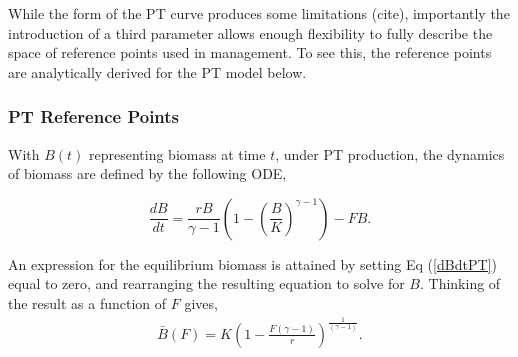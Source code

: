 \documentclass[12pt]{article}
\begin{document}



%
While the form of the PT curve produces some limitations {(\color{red}cite)}, 
importantly the %
introduction of a third parameter allows enough flexibility to fully describe 
the space of reference points used in management. To see this, the reference 
points are analytically derived for the PT model below. %


%
\subsubsection{PT Reference Points}\label{ptRef}
%
With $B(t)$ representing biomass at time $t$, under PT production, the 
dynamics of biomass are defined by the following ODE,
 
\begin{equation}
\frac{dB}{dt} = \frac{r B}{\gamma-1} \left(1-\left(\frac{B}{K}\right)^{\gamma-1}\right) - FB. \label{dBdtPT}
\end{equation}

An expression for the equilibrium biomass is attained by setting Eq (\ref{dBdtPT}) 
equal to zero, and rearranging the resulting equation to solve for $B$. 
Thinking of the result as a function of $F$ gives, 
\begin{align}
\bar B(F) = K\left(1-\frac{F(\gamma-1)}{r}\right)^{\frac{1}{(\gamma-1)}}. \label{BbarPT}
\end{align}
\end{document}
